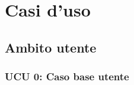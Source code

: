  \section{Casi d'uso}

\iffalse
\begin{description}[leftmargin=0cm]
\item[Attori:] utente autenticato;
\item[Descrizione:]
\item[Precondizione:]
\item[Scenario principale:]\
\begin{enumerate}
\item
\end{enumerate}
\item[Postcondizione:]
\end{description}
\fi

\subsection{Ambito utente}

\subsubsection{UCU 0: Caso base utente }

